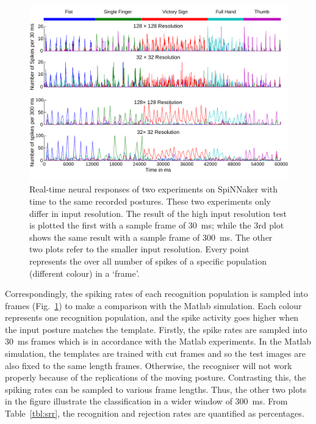 \begin{figure}
\centering
	\includegraphics[width=\textwidth]{pics_icann/rateSpiNN.pdf}
	\caption{Real-time neural responses of two experiments on SpiNNaker with time to the same recorded postures.
	These two experiments only differ in input resolution.
	The result of the high input resolution test is plotted the first with a sample frame of 30~ms; 
	while the 3rd plot shows the same result with a sample frame of 300~ms.
	The other two plots refer to the smaller input resolution.
	Every point represents the over all number of spikes of a specific population (different colour) in a `frame'.
	}
	\label{fig:spikerec}
\end{figure}

Correspondingly, the spiking rates of each recognition population is sampled into frames (Fig.~\ref{fig:spikerec}) to make a comparison with the Matlab simulation. 
Each colour represents one recognition population, and the spike activity goes higher when the input posture matches the template. 
Firstly, the spike rates are sampled into 30~ms frames which is in accordance with the Matlab experiments.
In the Matlab simulation, the templates are trained with cut frames and so the test images are also fixed to the same length frames.
Otherwise, the recogniser will not work properly because of the replications of the moving posture.
Contrasting this, the spiking rates can be sampled to various frame lengths.
Thus, the other two plots in the figure illustrate the classification in a wider window of 300~ms.
From Table~\ref{tbl:srr}, the recognition and rejection rates are quantified as percentages.

